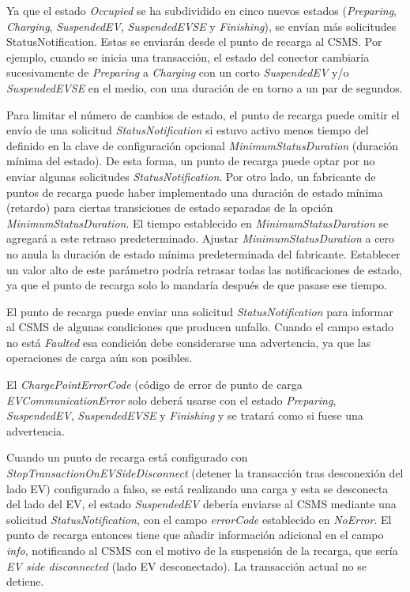 \documentclass[12pt,a4paper,onecolumn,oneside]{report}
\begin{document}
Ya que el estado \textit{Occupied} se ha subdividido en cinco nuevos estados (\textit{Preparing}, \textit{Charging}, \textit{SuspendedEV}, \textit{SuspendedEVSE} y \textit{Finishing}), se envían más solicitudes StatusNotification. Estas se enviarán desde el punto de recarga al CSMS. Por ejemplo, cuando se inicia una transacción, el estado del conector cambiaría sucesivamente de \textit{Preparing} a \textit{Charging} con un corto \textit{SuspendedEV} y/o \textit{SuspendedEVSE} en el medio, con una duración de en torno a un par de segundos.

Para limitar el número de cambios de estado, el punto de recarga puede omitir el envío de una solicitud \textit{StatusNotification} si estuvo activo menos tiempo del definido en la clave de configuración opcional \textit{MinimumStatusDuration} (duración mínima del estado). De esta forma, un punto de recarga puede optar por no enviar algunas solicitudes \textit{StatusNotification}. Por otro lado, un fabricante de puntos de recarga puede haber implementado una duración de estado mínima (retardo) para ciertas transiciones de estado separadas de la opción \textit{MinimumStatusDuration}. El tiempo establecido en \textit{MinimumStatusDuration} se agregará a este retraso predeterminado. Ajustar \textit{MinimumStatusDuration} a cero no anula la duración de estado mínima predeterminada del fabricante. Establecer un valor alto de este parámetro podría retrasar todas las notificaciones de estado, ya que el punto de recarga solo lo mandaría después de que pasase ese tiempo.

El punto de recarga puede enviar una solicitud \textit{StatusNotification} para informar al CSMS de algunas condiciones que producen unfallo. Cuando el campo estado no está \textit{Faulted} esa condición debe considerarse una advertencia, ya que las operaciones de carga aún son posibles.

El \textit{ChargePointErrorCode} (código de error de punto de carga \textit{EVCommunicationError} solo deberá usarse con el estado \textit{Preparing}, \textit{SuspendedEV}, \textit{SuspendedEVSE} y \textit{Finishing} y se tratará como si fuese una advertencia.

Cuando un punto de recarga está configurado con \textit{StopTransactionOnEVSideDisconnect} (detener la transacción tras desconexión del lado EV) configurado a falso, se está realizando una carga y esta se desconecta del lado del EV, el estado \textit{SuspendedEV} debería enviarse al CSMS mediante una solicitud \textit{StatusNotification}, con el campo \textit{errorCode} establecido en \textit{NoError}. El punto de recarga entonces tiene que añadir información adicional en el campo \textit{info}, notificando al CSMS con el motivo de la suspensión de la recarga, que sería \textit{EV side disconnected} (lado EV desconectado). La transacción actual no se detiene.
\end{document}
